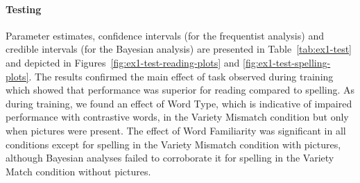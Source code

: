 \documentclass[doc,floatsintext]{apa6}
\let\oldparagraph\paragraph
\renewcommand{\paragraph}[1]{\oldparagraph{#1}\mbox{}}
\begin{document}
\paragraph{Testing}\label{testing-1}

Parameter estimates, confidence intervals (for the frequentist analysis)
and credible intervals (for the Bayesian analysis) are presented in
Table~\ref{tab:ex1-test} and depicted in
Figures~\ref{fig:ex1-test-reading-plots} and
\ref{fig:ex1-test-spelling-plots}. The results confirmed the main effect
of task observed during training which showed that performance was
superior for reading compared to spelling. As during training, we found
an effect of Word Type, which is indicative of impaired performance with
contrastive words, in the Variety Mismatch condition but only when
pictures were present. The effect of Word Familiarity was significant in
all conditions except for spelling in the Variety Mismatch condition
with pictures, although Bayesian analyses failed to corroborate it for
spelling in the Variety Match condition without pictures.
\end{document}
